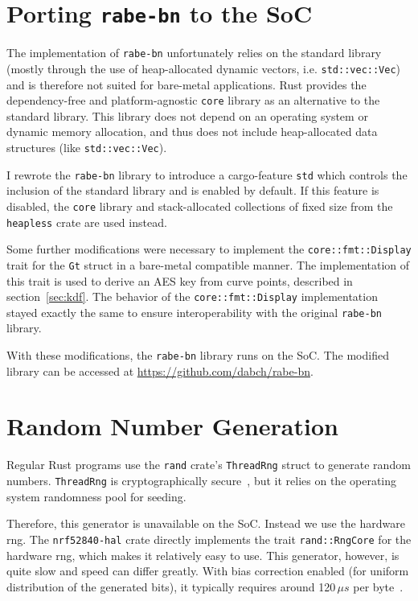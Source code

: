 \section{Porting \texttt{rabe-bn} to the SoC}

The implementation of \texttt{rabe-bn} unfortunately relies on the standard library (mostly through the use of heap-allocated dynamic vectors, i.e. \texttt{std::vec::Vec}) and is therefore not suited for bare-metal applications.
Rust provides the dependency-free and platform-agnostic \texttt{core} library as an alternative to the standard library.
This library does not depend on an operating system or dynamic memory allocation, and thus does not include heap-allocated data structures (like \texttt{std::vec::Vec}).

I rewrote the \texttt{rabe-bn} library to introduce a cargo-feature \texttt{std} which controls the inclusion of the standard library and is enabled by default.
If this feature is disabled, the \texttt{core} library and stack-allocated collections of fixed size from the \texttt{heapless} crate are used instead.

Some further modifications were necessary to implement the \texttt{core::fmt::Display} trait for the \texttt{Gt} struct in a bare-metal compatible manner.
The implementation of this trait is used to derive an AES key from curve points, described in section~\ref{sec:kdf}.
The behavior of the \texttt{core::fmt::Display} implementation stayed exactly the same to ensure interoperability with the original \texttt{rabe-bn} library.

With these modifications, the \texttt{rabe-bn} library runs on the SoC.
The modified library can be accessed at \url{https://github.com/dabch/rabe-bn}.

\section{Random Number Generation}
Regular Rust programs use the \texttt{rand} \gls{crate}'s \verb+ThreadRng+ struct to generate random numbers.
\texttt{ThreadRng} is cryptographically secure~\cite{noauthor_rust_nodate}, but it relies on the operating system randomness pool for seeding.

Therefore, this generator is unavailable on the SoC.
Instead we use the hardware \acrshort{rng}.
The \texttt{nrf52840-hal} \gls{crate} directly implements the trait \texttt{rand::RngCore} for the hardware \acrshort{rng}, which makes it relatively easy to use.
This generator, however, is quite slow and speed can differ greatly. With bias correction enabled (for uniform distribution of the generated bits), it typically requires around 120\,$\mu s$ per byte~\cite{nordic_semiconductor_nrf52840_nodate}.

